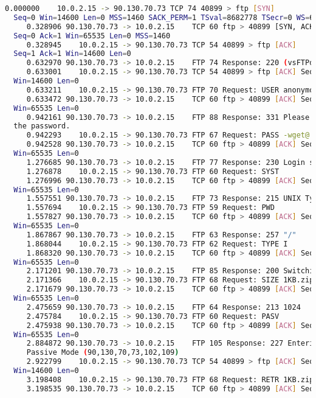 \documentclass[a4paper]{report} %
\begin{document}
\begin{lstlisting}[language=bash]
     0.000000    10.0.2.15 -> 90.130.70.73 TCP 74 40899 > ftp [SYN]
  Seq=0 Win=14600 Len=0 MSS=1460 SACK_PERM=1 TSval=8682778 TSecr=0 WS=64
     0.328906 90.130.70.73 -> 10.0.2.15    TCP 60 ftp > 40899 [SYN, ACK]
  Seq=0 Ack=1 Win=65535 Len=0 MSS=1460
     0.328945    10.0.2.15 -> 90.130.70.73 TCP 54 40899 > ftp [ACK]
  Seq=1 Ack=1 Win=14600 Len=0
     0.632970 90.130.70.73 -> 10.0.2.15    FTP 74 Response: 220 (vsFTPd 2.3.5)
     0.633001    10.0.2.15 -> 90.130.70.73 TCP 54 40899 > ftp [ACK] Seq=1 Ack=21
  Win=14600 Len=0
     0.633211    10.0.2.15 -> 90.130.70.73 FTP 70 Request: USER anonymous
     0.633472 90.130.70.73 -> 10.0.2.15    TCP 60 ftp > 40899 [ACK] Seq=21 Ack=17
  Win=65535 Len=0
     0.942161 90.130.70.73 -> 10.0.2.15    FTP 88 Response: 331 Please specify
  the password.
     0.942293    10.0.2.15 -> 90.130.70.73 FTP 67 Request: PASS -wget@
     0.942528 90.130.70.73 -> 10.0.2.15    TCP 60 ftp > 40899 [ACK] Seq=55 Ack=30
  Win=65535 Len=0
     1.276685 90.130.70.73 -> 10.0.2.15    FTP 77 Response: 230 Login successful.
     1.276878    10.0.2.15 -> 90.130.70.73 FTP 60 Request: SYST
     1.276996 90.130.70.73 -> 10.0.2.15    TCP 60 ftp > 40899 [ACK] Seq=78 Ack=36
  Win=65535 Len=0
     1.557551 90.130.70.73 -> 10.0.2.15    FTP 73 Response: 215 UNIX Type: L8
     1.557694    10.0.2.15 -> 90.130.70.73 FTP 59 Request: PWD
     1.557827 90.130.70.73 -> 10.0.2.15    TCP 60 ftp > 40899 [ACK] Seq=97 Ack=41
  Win=65535 Len=0
     1.867867 90.130.70.73 -> 10.0.2.15    FTP 63 Response: 257 "/"
     1.868044    10.0.2.15 -> 90.130.70.73 FTP 62 Request: TYPE I
     1.868320 90.130.70.73 -> 10.0.2.15    TCP 60 ftp > 40899 [ACK] Seq=106 Ack=49
  Win=65535 Len=0
     2.171201 90.130.70.73 -> 10.0.2.15    FTP 85 Response: 200 Switching to Binary mode.
     2.171366    10.0.2.15 -> 90.130.70.73 FTP 68 Request: SIZE 1KB.zip
     2.171679 90.130.70.73 -> 10.0.2.15    TCP 60 ftp > 40899 [ACK] Seq=137 Ack=63
  Win=65535 Len=0
     2.475659 90.130.70.73 -> 10.0.2.15    FTP 64 Response: 213 1024
     2.475784    10.0.2.15 -> 90.130.70.73 FTP 60 Request: PASV
     2.475938 90.130.70.73 -> 10.0.2.15    TCP 60 ftp > 40899 [ACK] Seq=147 Ack=69
  Win=65535 Len=0
     2.884872 90.130.70.73 -> 10.0.2.15    FTP 105 Response: 227 Entering
     Passive Mode (90,130,70,73,102,109)
     2.922799    10.0.2.15 -> 90.130.70.73 TCP 54 40899 > ftp [ACK] Seq=69 Ack=197
  Win=14600 Len=0
     3.198408    10.0.2.15 -> 90.130.70.73 FTP 68 Request: RETR 1KB.zip
     3.198535 90.130.70.73 -> 10.0.2.15    TCP 60 ftp > 40899 [ACK] Seq=197 Ack=83

\end{lstlisting}
\end{document}
